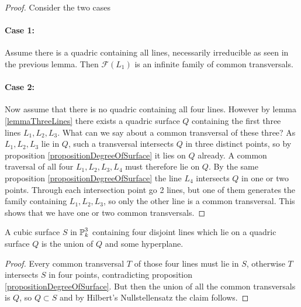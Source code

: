 \begin{proof}
Consider the two cases
\paragraph{Case 1:} Assume there is a quadric containing all lines, necessarily irreducible as seen in the previous lemma.
Then $\mathcal F(L_1)$ is an infinite family of common transversals.
\paragraph{Case 2:} Now assume that there is no quadric containing all four lines.
However by lemma \ref{lemmaThreeLines} there exists a quadric surface $Q$ containing the first three lines $L_1,L_2,L_3$.
What can we say about a common transversal of these three?
As $L_1,L_2,L_3$ lie in $Q$, such a transversal intersects $Q$ in three distinct points, so by proposition \ref{propositionDegreeOfSurface} it lies on $Q$ already.
A common traversal of all four $L_1,L_2,L_3,L_4$ must therefore lie on $Q$.
By the same proposition \ref{propositionDegreeOfSurface} the line $L_4$ intersects $Q$ in one or two points.
Through each intersection point go 2 lines, but one of them generates the family containing $L_1,L_2,L_3$, so only the other line is a common transversal.
This shows that we have one or two common transversals.
\end{proof}

\begin{corollary} \label{corollaryCubicContainsQuadric}
A cubic surface $S$ in $\operatorname{\mathbb P}^3_k$ containing four disjoint lines which lie on a quadric surface $Q$ is the union of $Q$ and some hyperplane.
\end{corollary}
\begin{proof}
Every common transversal $T$ of those four lines must lie in $S$, otherwise $T$ intersects $S$ in four points, contradicting proposition \ref{propositionDegreeOfSurface}.
But then the union of all the common transversals is $Q$, so $Q \subset S$ and by Hilbert's Nullstellensatz the claim follows.
\end{proof}
